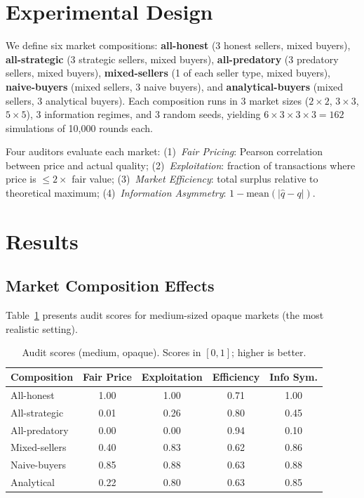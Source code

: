 \documentclass[11pt]{article}
\begin{document}
\section{Experimental Design}

We define six market compositions:
\textbf{all-honest} (3 honest sellers, mixed buyers),
\textbf{all-strategic} (3 strategic sellers, mixed buyers),
\textbf{all-predatory} (3 predatory sellers, mixed buyers),
\textbf{mixed-sellers} (1 of each seller type, mixed buyers),
\textbf{naive-buyers} (mixed sellers, 3 naive buyers), and
\textbf{analytical-buyers} (mixed sellers, 3 analytical buyers).
Each composition runs in 3 market sizes ($2{\times}2$, $3{\times}3$, $5{\times}5$), 3 information regimes, and 3 random seeds, yielding $6 \times 3 \times 3 \times 3 = 162$ simulations of 10{,}000 rounds each.

Four auditors evaluate each market:
(1)~\emph{Fair Pricing}: Pearson correlation between price and actual quality;
(2)~\emph{Exploitation}: fraction of transactions where price is $\leq 2\times$ fair value;
(3)~\emph{Market Efficiency}: total surplus relative to theoretical maximum;
(4)~\emph{Information Asymmetry}: $1 - \text{mean}(|\hat{q} - q|)$.

\section{Results}

\subsection{Market Composition Effects}

Table~\ref{tab:audit} presents audit scores for medium-sized opaque markets (the most realistic setting).

\begin{table}[h]
\centering
\caption{Audit scores (medium, opaque). Scores in $[0,1]$; higher is better.}
\label{tab:audit}
\begin{tabular}{lcccc}
\toprule
Composition & Fair Price & Exploitation & Efficiency & Info Sym. \\
\midrule
All-honest    & 1.00 & 1.00 & 0.71 & 1.00 \\
All-strategic & 0.01 & 0.26 & 0.80 & 0.45 \\
All-predatory & 0.00 & 0.00 & 0.94 & 0.10 \\
Mixed-sellers & 0.40 & 0.83 & 0.62 & 0.86 \\
Naive-buyers  & 0.85 & 0.88 & 0.63 & 0.88 \\
Analytical    & 0.22 & 0.80 & 0.63 & 0.85 \\
\bottomrule
\end{tabular}
\end{table}
\end{document}
